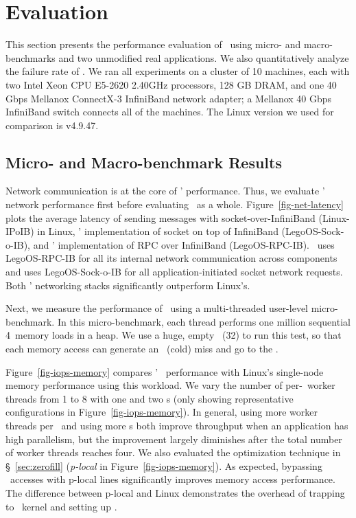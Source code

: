 \section{Evaluation}
\label{sec:results}

This section presents the performance evaluation of \lego\ using micro- and macro-benchmarks and two unmodified real applications.
We also quantitatively analyze the failure rate of \lego.
We ran all experiments on a cluster of 10 machines, each with two Intel Xeon CPU E5-2620 2.40GHz
processors, 128 GB DRAM, and one 40 Gbps Mellanox ConnectX-3 InfiniBand network adapter;
a Mellanox 40 Gbps InfiniBand switch connects all of the machines. 
The Linux version we used for comparison is v4.9.47.

\subsection{Micro- and Macro-benchmark Results}
Network communication is at the core of \lego' performance.
Thus, we evaluate \lego' network performance first before evaluating \lego\ as a whole.
Figure~\ref{fig-net-latency} plots the average latency of sending messages with socket-over-InfiniBand (Linux-IPoIB) in Linux,
\lego' implementation of socket on top of InfiniBand (LegoOS-Sock-o-IB), and \lego' implementation of RPC over InfiniBand (LegoOS-RPC-IB).
\lego\ uses LegoOS-RPC-IB for all its internal network communication across components and uses LegoOS-Sock-o-IB for 
all application-initiated socket network requests.
Both \lego' networking stacks significantly outperform Linux's.

Next, we measure the performance of \mcomponent\ using a multi-threaded user-level micro-benchmark. 
In this micro-benchmark, each thread performs one million sequential 4\KB\ memory loads in a heap.
We use a huge, empty \excache\ (32\GB) to run this test, 
so that each memory access can generate an \excache\ (cold) miss and go to the \mcomponent.

Figure~\ref{fig-iops-memory} compares \lego' \mcomponent\ performance 
with Linux's single-node memory performance using this workload.
We vary the number of per-\mcomponent\ worker threads from 1 to 8 
with one and two \mcomponent{}s (only showing representative configurations in Figure~\ref{fig-iops-memory}).
In general, using more worker threads per \mcomponent\ and using more \mcomponent{}s both improve throughput when an application has high parallelism,
but the improvement largely diminishes after the total number of worker threads reaches four.
We also evaluated the optimization technique in \S~\ref{sec:zerofill} ({\em p-local} in Figure~\ref{fig-iops-memory}).
As expected, bypassing \mcomponent\ accesses with p-local lines significantly 
improves memory access performance.
The difference between p-local and Linux demonstrates the overhead of trapping to \lego\ kernel and setting up \excache.

